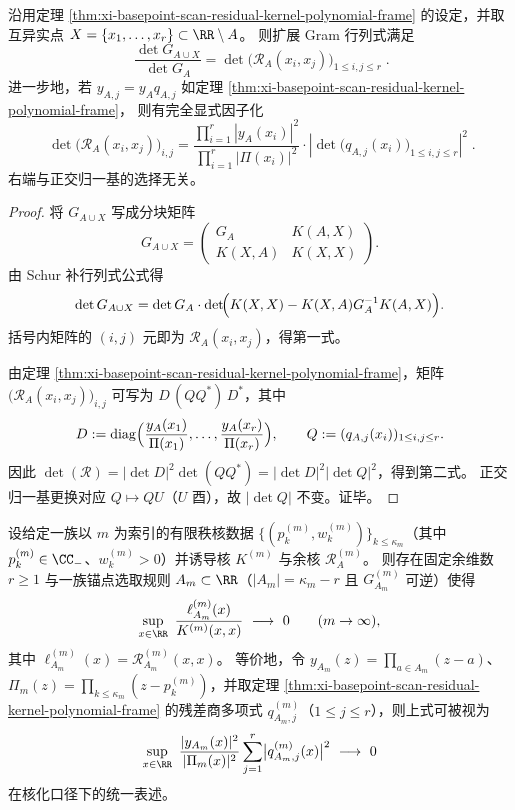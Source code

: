 \begin{proposition}\label{prop:xi-basepoint-scan-gram-plucker-residual-factorization}
沿用定理 \ref{thm:xi-basepoint-scan-residual-kernel-polynomial-frame} 的设定，并取互异实点
\(
X=\{x_1,\dots,x_r\}\subset\RR\setminus A
\)。
则扩展 Gram 行列式满足
\[
\boxed{\;
\frac{\det G_{A\cup X}}{\det G_A}
=\det\bigl(\mathcal{R}_A(x_i,x_j)\bigr)_{1\le i,j\le r}\; }.
\]
进一步地，若 \(y_{A,j}=y_A q_{A,j}\) 如定理 \ref{thm:xi-basepoint-scan-residual-kernel-polynomial-frame}，
则有完全显式因子化
\[
\boxed{\;
\det\bigl(\mathcal{R}_A(x_i,x_j)\bigr)_{i,j}
=
\frac{\prod_{i=1}^{r}|y_A(x_i)|^2}{\prod_{i=1}^{r}|\Pi(x_i)|^2}\cdot
\left|\det\bigl(q_{A,j}(x_i)\bigr)_{1\le i,j\le r}\right|^2\; }.
\]
右端与正交归一基的选择无关。
\end{proposition}
\begin{proof}
将 \(G_{A\cup X}\) 写成分块矩阵
\[
G_{A\cup X}=
\begin{pmatrix}
G_A & K(A,X)\\
K(X,A) & K(X,X)
\end{pmatrix}.
\]
由 Schur 补行列式公式得
\[
\det G_{A\cup X}=\det G_A\cdot \det\!\Bigl(K(X,X)-K(X,A)G_A^{-1}K(A,X)\Bigr).
\]
括号内矩阵的 \((i,j)\) 元即为 \(\mathcal{R}_A(x_i,x_j)\)，得第一式。
\par
由定理 \ref{thm:xi-basepoint-scan-residual-kernel-polynomial-frame}，矩阵 \(\bigl(\mathcal{R}_A(x_i,x_j)\bigr)_{i,j}\) 可写为
\(
D\,(Q Q^\ast)\,D^\ast
\)，其中
\[
D:=\mathrm{diag}\Bigl(\frac{y_A(x_1)}{\Pi(x_1)},\dots,\frac{y_A(x_r)}{\Pi(x_r)}\Bigr),
\qquad
Q:=(q_{A,j}(x_i))_{1\le i,j\le r}.
\]
因此
\(
\det(\mathcal{R})=|\det D|^2\det(QQ^\ast)=|\det D|^2|\det Q|^2
\)，得到第二式。
正交归一基更换对应 \(Q\mapsto Q U\)（\(U\) 酉），故 \(|\det Q|\) 不变。证毕。
\end{proof}

\begin{conjecture}[残差多项式范数的统一衰减机制]\label{conj:xi-basepoint-scan-residual-polynomial-norm-decay}
设给定一族以 \(m\) 为索引的有限秩核数据 \(\{(p_k^{(m)},w_k^{(m)})\}_{k\le \kappa_m}\)（其中 \(p_k^{(m)}\in\CC_-\)、\(w_k^{(m)}>0\)）并诱导核 \(K^{(m)}\) 与余核 \(\mathcal{R}_{A}^{(m)}\)。
则存在固定余维数 \(r\ge 1\) 与一族锚点选取规则 \(A_m\subset\RR\)（\(|A_m|=\kappa_m-r\) 且 \(G_{A_m}^{(m)}\) 可逆）使得
\[
\sup_{x\in\RR}\ \frac{\ell_{A_m}^{(m)}(x)}{K^{(m)}(x,x)}\ \longrightarrow\ 0\qquad(m\to\infty),
\]
其中 \(\ell_{A_m}^{(m)}(x)=\mathcal{R}_{A_m}^{(m)}(x,x)\)。
等价地，令 \(y_{A_m}(z)=\prod_{a\in A_m}(z-a)\)、\(\Pi_m(z)=\prod_{k\le\kappa_m}(z-p_k^{(m)})\)，并取定理 \ref{thm:xi-basepoint-scan-residual-kernel-polynomial-frame} 的残差商多项式 \(q_{A_m,j}^{(m)}\)（\(1\le j\le r\)），则上式可被视为
\[
\sup_{x\in\RR}\ \frac{|y_{A_m}(x)|^2}{|\Pi_m(x)|^2}\sum_{j=1}^{r}\bigl|q_{A_m,j}^{(m)}(x)\bigr|^2\ \longrightarrow\ 0
\]
在核化口径下的统一表述。
\end{conjecture}

\endinput
